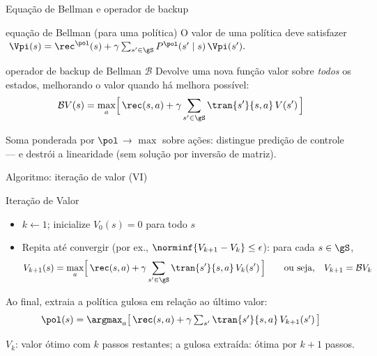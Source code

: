 \documentclass[aspectratio=169, 11pt]{beamer}
\newcommand{\Bop}{\mathcal{B}}                 %
\begin{document}
\begin{frame}{Equação de Bellman e operador de backup}
  \begin{defbox}[fontupper=\small]{equação de Bellman (para uma política)}
    O valor de uma política deve satisfazer
    \(\; \Vpi(s) = \rec^{\pol}(s) + \gamma \sum_{s' \in \gS} P^{\pol}(s' \mid s)\, \Vpi(s'). \)
  \end{defbox}
  \begin{defbox}[fontupper=\small]{operador de backup de Bellman $\Bop$}
    Devolve uma nova função valor sobre \emph{todos} os estados, melhorando o valor
    quando há melhora possível:
    \vspace{-0.5em}
    \[
      \Bop V(s) = \max_{a} \Bigl[\, \rec(s,a) + \gamma \sum_{s' \in \gS} \tran{s'}{s,a}\, V(s') \,\Bigr]
    \]
    \vspace{-1.4em}
  \end{defbox}
  \begin{ideiabox}
    Soma ponderada por $\pol$ → $\max$ sobre ações: distingue predição de controle --- e
    destrói a linearidade (sem solução por inversão de matriz).
  \end{ideiabox}
\end{frame}

\begin{frame}{Algoritmo: iteração de valor (VI)}
  \begin{algbox}{Iteração de Valor}
    \begin{itemize}\setlength{\itemsep}{0.25ex}
      \item $k \leftarrow 1$; inicialize $V_0(s) = 0$ para todo $s$
      \item Repita até convergir (por ex., $\norminf{V_{k+1} - V_k} \le \epsilon$):
            para cada $s \in \gS$,
        \[
          V_{k+1}(s) = \max_{a} \Bigl[\, \rec(s,a) + \gamma \sum_{s' \in \gS} \tran{s'}{s,a}\, V_k(s') \,\Bigr]
          \qquad \text{ou seja,} \quad V_{k+1} = \Bop V_k
        \]
    \end{itemize}
  \end{algbox}
  \vspace{-0.4em}
  {\small Ao final, extraia a política \alert{gulosa} em relação ao último valor:}
  \vspace{-0.3em}
  \[
    \textstyle \pol(s) = \argmax_{a} \bigl[\, \rec(s,a) + \gamma \sum_{s'} \tran{s'}{s,a}\, V_{k+1}(s') \,\bigr]
  \]
  \vspace{-1.0em}
  \begin{ideiabox}
    $V_k$: valor ótimo com $k$ passos restantes; a gulosa extraída: ótima por $k+1$
    passos.
  \end{ideiabox}
\end{frame}
\end{document}
